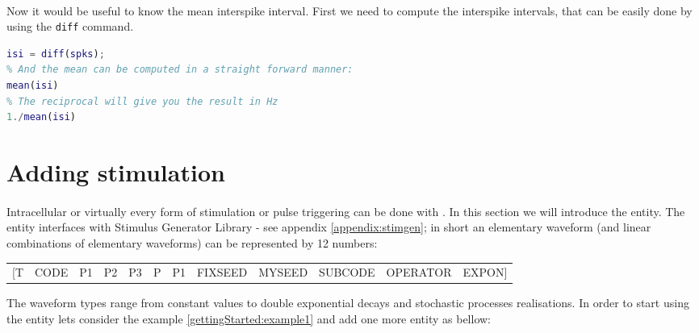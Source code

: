 \paragraph{}
Now it would be useful to know the mean interspike interval. First we need to compute the interspike intervals, that can be easily done by using the \texttt{diff} command. 

\begin{lstlisting}[language=matlab,morekeywords={findpeaks,THRESHOLD,MINPEAKDISTANCE},escapeinside=\{\}]
% Compute te interspike intervals
isi = diff(spks);
% And the mean can be computed in a straight forward manner:
mean(isi)
% The reciprocal will give you the result in Hz
1./mean(isi)
\end{lstlisting}


\section{Adding stimulation}
\paragraph{}
Intracellular or virtually every form of stimulation or pulse triggering can be done with \progname. In this section we will introduce the  entity.
The  entity interfaces with Stimulus Generator Library - see appendix \ref{appendix:stimgen}; in short an elementary waveform (and linear combinations of elementary waveforms) can be represented by 12 numbers:

\begin{center}
\footnotesize\ttfamily
\begin{tabular}{rrrrrrrrrrrr}
[T & CODE & P1 & P2 & P3 & P & P1 & FIXSEED & MYSEED & SUBCODE & OPERATOR & EXPON]
\end{tabular}
\end{center}

The waveform types range from constant values to double exponential decays and stochastic processes realisations. In order to start using the  entity lets consider the example \ref{gettingStarted:example1} and add one more entity as bellow:

